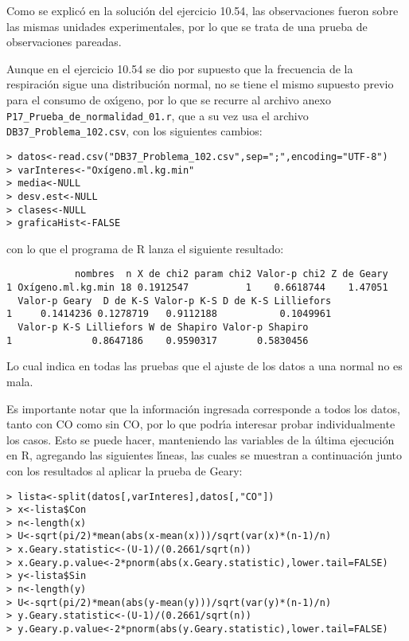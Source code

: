 \begin{solucion}
 Como se explic\'o en la soluci\'on del ejercicio 10.54,
 las observaciones fueron sobre las mismas unidades experimentales,
 por lo que se trata de una prueba de observaciones pareadas.
 \par 
 Aunque en el ejercicio 10.54 se dio por supuesto que la frecuencia de la respiraci\'on sigue una distribuci\'on normal,
 no se tiene el mismo supuesto previo para el consumo de ox\'{\i}geno,
 por lo que se recurre al archivo anexo
 \texttt{P17\_Prueba\_de\_normalidad\_01.r}, que a su vez usa el archivo 
 \texttt{DB37\_Problema\_102.csv}, con los siguientes cambios:
 \begin{verbatim}
> datos<-read.csv("DB37_Problema_102.csv",sep=";",encoding="UTF-8")
> varInteres<-"Oxígeno.ml.kg.min"
> media<-NULL
> desv.est<-NULL
> clases<-NULL
> graficaHist<-FALSE
 \end{verbatim}
 \vspace{-0.5cm}
 con lo que el programa de R lanza el siguiente resultado:
 \begin{verbatim}
            nombres  n X de chi2 param chi2 Valor-p chi2 Z de Geary
1 Oxígeno.ml.kg.min 18 0.1912547          1    0.6618744    1.47051
  Valor-p Geary  D de K-S Valor-p K-S D de K-S Lilliefors
1     0.1414236 0.1278719   0.9112188           0.1049961
  Valor-p K-S Lilliefors W de Shapiro Valor-p Shapiro
1              0.8647186    0.9590317       0.5830456
 \end{verbatim}
 \vspace{-0.5cm}
 Lo cual indica en todas las pruebas que el ajuste de los datos a una normal
 no es mala.
 \par 
 Es importante notar que la informaci\'on ingresada corresponde a todos los datos,
 tanto con CO como sin CO, por lo que podr\'{\i}a interesar probar
 individualmente los casos.
 Esto se puede hacer, manteniendo las variables de la \'ultima ejecuci\'on
 en R, agregando las siguientes l\'{\i}neas,
 las cuales se muestran a continuaci\'on junto con los resultados
 al aplicar la prueba de Geary:
 \begin{verbatim}
> lista<-split(datos[,varInteres],datos[,"CO"])
> x<-lista$Con
> n<-length(x)
> U<-sqrt(pi/2)*mean(abs(x-mean(x)))/sqrt(var(x)*(n-1)/n)
> x.Geary.statistic<-(U-1)/(0.2661/sqrt(n))
> x.Geary.p.value<-2*pnorm(abs(x.Geary.statistic),lower.tail=FALSE)
> y<-lista$Sin
> n<-length(y)
> U<-sqrt(pi/2)*mean(abs(y-mean(y)))/sqrt(var(y)*(n-1)/n)
> y.Geary.statistic<-(U-1)/(0.2661/sqrt(n))
> y.Geary.p.value<-2*pnorm(abs(y.Geary.statistic),lower.tail=FALSE)

\end{verbatim}
\end{solucion}
